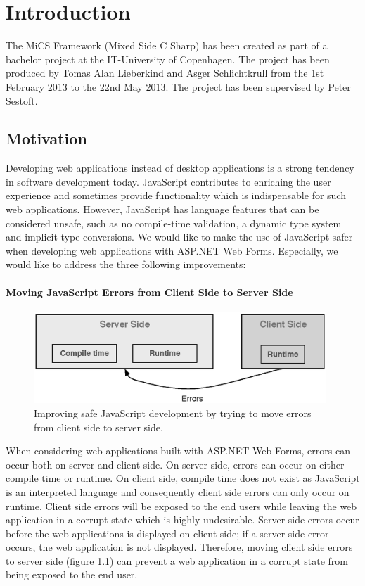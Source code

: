 
\chapter{Introduction} %
\label{cha:introduction}
	The MiCS Framework (Mixed Side C Sharp) has been created as part of a bachelor project at the IT-University of Copenhagen. The project  has been produced by Tomas Alan Lieberkind and Asger Schlichtkrull from the 1st February 2013 to the 22nd May 2013. The project has been supervised by Peter Sestoft.
	\section{Motivation} %
\label{sec:motivation}

Developing web applications instead of desktop applications is a strong tendency in software development today. JavaScript contributes to enriching the user experience and sometimes provide functionality which is indispensable for such web applications. However, JavaScript has language features that can be considered unsafe, such as no compile-time validation, a dynamic type system and implicit type conversions. We would like to make the use of JavaScript safer when developing web applications with ASP.NET Web Forms. Especially, we would like to address the three following improvements:

\subsubsection{Moving JavaScript Errors from Client Side to Server Side} %
	\begin{figure}
		\begin{center}
			\centerline{\includegraphics[width=11cm]{resources/images/MovingErrors.eps}}
		\end{center}
		\caption{Improving safe JavaScript development by trying to move errors from client side to server side.}
		\label{movingErrors}
	\end{figure}
	When considering web applications built with ASP.NET Web Forms, errors can occur both on server and client side. On server side, errors can occur on either compile time or runtime. On client side, compile time does not exist as JavaScript is an interpreted language and consequently client side errors can only occur on runtime. Client side errors will be exposed to the end users while leaving the web application in a corrupt state which is highly undesirable. Server side errors occur before the web applications is displayed on client side; if a server side error occurs, the web application is not displayed. Therefore, moving client side errors to server side (figure \ref{movingErrors}) can prevent a web application in a corrupt state from being exposed to the end user. 

